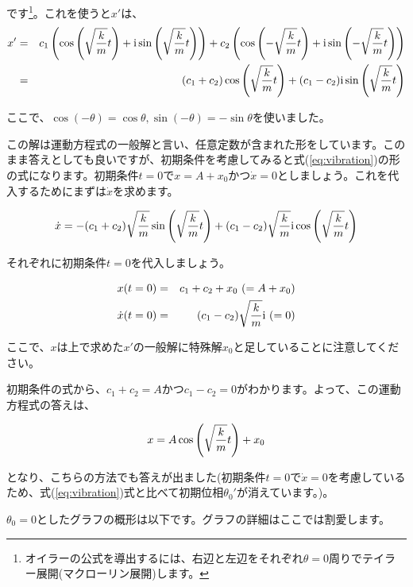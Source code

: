 です\footnote{オイラーの公式を導出するには、右辺と左辺をそれぞれ$\theta=0$周りでテイラー展開(マクローリン展開)します。}。これを使うと$x'$は、
\begin{eqnarray}
    x' &=& c_1\left(\cos\left(\sqrt{\frac{k}{m}}t\right) + \mathrm{i}\sin\left(\sqrt{\frac{k}{m}}t\right)\right) + c_2\left(\cos\left(-\sqrt{\frac{k}{m}}t\right) + \mathrm{i}\sin\left(-\sqrt{\frac{k}{m}}t\right)\right) \notag \\
       &=& (c_1+c_2)\cos\left(\sqrt{\frac{k}{m}}t\right) + (c_1-c_2)\mathrm{i}\sin\left(\sqrt{\frac{k}{m}}t\right) \notag
\end{eqnarray}

ここで、$\cos(-\theta) = \cos\theta, \sin(-\theta) = -\sin\theta$を使いました。

この解は運動方程式の一般解と言い、任意定数が含まれた形をしています。このまま答えとしても良いですが、初期条件を考慮してみると式(\ref{eq:vibration})の形の式になります。初期条件$t=0$で$x=A+x_0$かつ$\dot{x}=0$としましょう。これを代入するためにまずは$\dot{x}$を求めます。

\begin{eqnarray}
    \dot{x} = -(c_1+c_2)\sqrt{\frac{k}{m}}\sin\left(\sqrt{\frac{k}{m}}t\right) + (c_1-c_2)\sqrt{\frac{k}{m}}\mathrm{i}\cos\left(\sqrt{\frac{k}{m}}t\right) \notag
\end{eqnarray}


それぞれに初期条件$t=0$を代入しましょう。

\begin{eqnarray}
    x(t=0)&=&c_1+c_2+x_0\ (=A+x_0) \notag \\
    \dot{x}(t=0)&=&(c_1-c_2)\sqrt{\frac{k}{m}}\mathrm{i}\ (=0) \notag
\end{eqnarray}

ここで、$x$は上で求めた$x'$の一般解に特殊解$x_0$と足していることに注意してください。

初期条件の式から、$c_1+c_2=A$かつ$c_1-c_2=0$がわかります。よって、この運動方程式の答えは、

\begin{equation}
    x = A\cos\left(\sqrt{\frac{k}{m}}t\right) + x_0\notag
\end{equation}

となり、こちらの方法でも答えが出ました(初期条件$t=0$で$\dot{x}=0$を考慮しているため、式(\ref{eq:vibration})式と比べて初期位相$\theta_0'$が消えています。)。

$\theta_0=0$としたグラフの概形は以下です。グラフの詳細はここでは割愛します。

